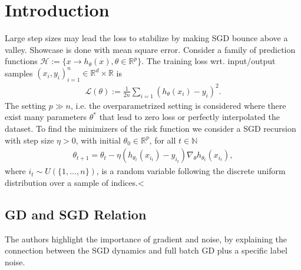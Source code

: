 




\maketitle

\tableofcontents

\section{Introduction}
Large step sizes may lead the loss to stabilize by making SGD bounce above a
valley. Showcase is done with mean square error. Consider a family of
prediction functions $\mathcal{H} := \{x \to h_\theta(x), \theta \in
\mathbb{R}^{p}\}$. The training loss wrt. input/output samples $(x_i,
y_i)_{i=1}^{n} \in \mathbb{R}^{d}\times\mathbb{R}$ is
\begin{align}
    \mathcal{L}(\theta) := \frac{1}{2n} \sum_{i=1} \left( h_\theta(x_i) -
    y_i \right)^{2}.
\end{align}
The setting $p \gg n$, i.e. the overparametrized setting is considered where
there exist many parameters $\theta^{*}$ that lead to zero loss or perfectly
interpolated the dataset. To find the minimizers of the risk function we
consider a SGD recursion with step size $\eta > 0$, with initial $\theta_0
\in \mathbb{R}^{p}$, for all $t \in \mathbb{N}$
\begin{align}
    \theta_{t+1} = \theta_t - \eta\left(h_{\theta_t}(x_{i_t})
    - y_{i_t}\right)
    \nabla_{\theta} h_{\theta_t}(x_{i_t}), \label{eq: sgd_it}
\end{align}
where $i_t \sim U(\{1,\ldots,n\})$, is a random variable following the
discrete uniform distribution over a sample of indices.<
\subsection{GD and SGD Relation}
The authors highlight the importance of gradient and noise, by explaining the
connection between the SGD dynamics and full batch GD plus a specific label
noise.

